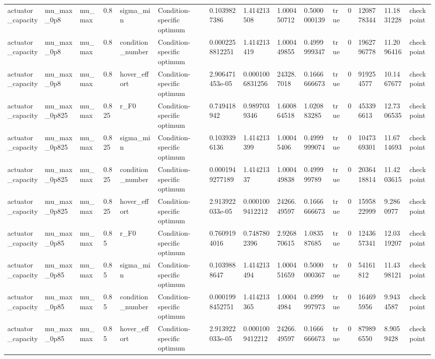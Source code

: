\begin{tabular}{@{}lllllllllllllll@{}}
actuator\_capacity & mu\_max\_0p8 & mu\_max & 0.8 & sigma\_min & Condition-specific optimum & 0.1039827386 & 1.414213508 & 1.000450712 & 0.5000000139 & true & 0 & 1208778344 & 11.1831228 & checkpoint \\
actuator\_capacity & mu\_max\_0p8 & mu\_max & 0.8 & condition\_number & Condition-specific optimum & 0.0002258812251 & 1.414213419 & 1.000449855 & 0.4999999347 & true & 0 & 1962796778 & 11.2096416 & checkpoint \\
actuator\_capacity & mu\_max\_0p8 & mu\_max & 0.8 & hover\_effort & Condition-specific optimum & 2.906471453e-05 & 0.0001006831256 & 24328.7018 & 0.1666666673 & true & 0 & 919254577 & 10.1467677 & checkpoint \\
actuator\_capacity & mu\_max\_0p825 & mu\_max & 0.825 & r\_F0 & Condition-specific optimum & 0.749418942 & 0.9897039346 & 1.600864518 & 1.020883285 & true & 0 & 453396613 & 12.7306535 & checkpoint \\
actuator\_capacity & mu\_max\_0p825 & mu\_max & 0.825 & sigma\_min & Condition-specific optimum & 0.1039396136 & 1.414213399 & 1.00045406 & 0.4999999074 & true & 0 & 1047369301 & 11.6714693 & checkpoint \\
actuator\_capacity & mu\_max\_0p825 & mu\_max & 0.825 & condition\_number & Condition-specific optimum & 0.0001949277189 & 1.41421337 & 1.000449838 & 0.499999789 & true & 0 & 2036418814 & 11.4203615 & checkpoint \\
actuator\_capacity & mu\_max\_0p825 & mu\_max & 0.825 & hover\_effort & Condition-specific optimum & 2.913922033e-05 & 0.0001009412212 & 24266.49597 & 0.1666666673 & true & 0 & 1595822999 & 9.2860977 & checkpoint \\
actuator\_capacity & mu\_max\_0p85 & mu\_max & 0.85 & r\_F0 & Condition-specific optimum & 0.7609194016 & 0.7487802396 & 2.926870615 & 1.083587685 & true & 0 & 1243657341 & 12.0319207 & checkpoint \\
actuator\_capacity & mu\_max\_0p85 & mu\_max & 0.85 & sigma\_min & Condition-specific optimum & 0.1039888647 & 1.414213494 & 1.000451659 & 0.5000000367 & true & 0 & 54161812 & 11.4398121 & checkpoint \\
actuator\_capacity & mu\_max\_0p85 & mu\_max & 0.85 & condition\_number & Condition-specific optimum & 0.0001998452751 & 1.414213365 & 1.00044984 & 0.4999997973 & true & 0 & 164695956 & 9.9434587 & checkpoint \\
actuator\_capacity & mu\_max\_0p85 & mu\_max & 0.85 & hover\_effort & Condition-specific optimum & 2.913922033e-05 & 0.0001009412212 & 24266.49597 & 0.1666666673 & true & 0 & 879896550 & 8.9059428 & checkpoint \\

\end{tabular}
